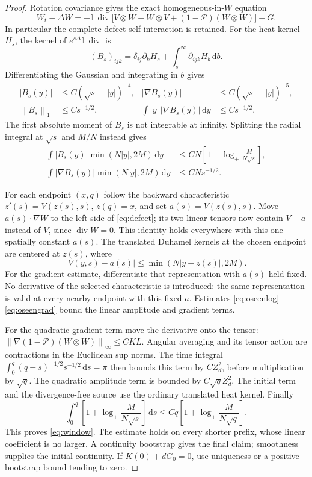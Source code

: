 \documentclass[11pt]{article}
\theoremstyle{remark}
\newcommand{\PP}{\mathcal P}
\newcommand{\dd}{\,\mathrm d}
\newcommand{\norm}[1]{\left\lVert#1\right\rVert}
\newcommand{\diver}{\operatorname{div}}
\begin{document}
\begin{proof}
Rotation covariance gives the exact homogeneous-in-$W$ equation
\begin{equation}\label{eq:defect}
 W_t-\Delta W=-\mathbb L\diver\big[V\otimes W+W\otimes V
                          +(1-\PP)(W\otimes W)\big]+G.
\end{equation}
In particular the complete defect self-interaction is retained.
For the heat kernel $H_s$, the kernel of $e^{s\Delta}\mathbb L\diver$ is
\[
 (B_s)_{ijk}=\delta_{ij}\partial_k H_s
                         +\int_s^\infty\partial_{ijk}H_b\dd b.
\]
Differentiating the Gaussian and integrating in $b$ gives
\begin{align*}
 |B_s(y)|&\leq C(\sqrt s+|y|)^{-4},&
 |\nabla B_s(y)|&\leq C(\sqrt s+|y|)^{-5},\\
 \norm{B_s}_1&\leq C s^{-1/2},&
 \int |y|\,|\nabla B_s(y)|\dd y&\leq C s^{-1/2}.
\end{align*}
The first absolute moment of $B_s$ is not integrable at infinity.
Splitting the radial integral at $\sqrt s$ and $M/N$ instead gives
\begin{align}
 \int |B_s(y)|\min(N|y|,2M)\dd y
 &\leq CN\left[1+\log_+\frac{M}{N\sqrt s}\right],\label{eq:oseenlog}\\
 \int |\nabla B_s(y)|\min(N|y|,2M)\dd y
 &\leq CNs^{-1/2}.\label{eq:oseengrad}
\end{align}

For each endpoint $(x,q)$ follow the backward characteristic
$z'(s)=V(z(s),s)$, $z(q)=x$, and set $a(s)=V(z(s),s)$.
Move $a(s)\cdot\nabla W$ to the left side of \eqref{eq:defect};
its two linear tensors now contain $V-a$ instead of $V$, since
$\diver W=0$. This identity holds everywhere with this one
spatially constant $a(s)$. The translated Duhamel kernels at the
chosen endpoint are centered at $z(s)$, where
\[
 |V(y,s)-a(s)|\leq\min(N|y-z(s)|,2M).
\]
For the gradient estimate, differentiate that representation with
$a(s)$ held fixed. No derivative of the selected characteristic is
introduced: the same representation is valid at every nearby endpoint
with this fixed $a$. Estimates \eqref{eq:oseenlog}--\eqref{eq:oseengrad}
bound the linear amplitude and gradient terms.

For the quadratic gradient term move the derivative onto the tensor:
$\norm{\nabla(1-\PP)(W\otimes W)}_\infty\leq CKL$.
Angular averaging and its tensor action are contractions in the
Euclidean sup norms. The time integral
$\int_0^q(q-s)^{-1/2}s^{-1/2}\dd s=\pi$ then bounds this term
by $CZ_d^2$, before multiplication by $\sqrt q$.
The quadratic amplitude term is bounded by $C\sqrt q Z_d^2$.
The initial term and the divergence-free source use the ordinary
translated heat kernel. Finally
\[
 \int_0^q\left[1+\log_+\frac{M}{N\sqrt s}\right]\dd s
 \leq Cq\left[1+\log_+\frac{M}{N\sqrt q}\right].
\]
This proves \eqref{eq:window}. The estimate holds on every shorter
prefix, whose linear coefficient is no larger. A continuity bootstrap
gives the final claim; smoothness supplies the initial continuity.
If $K(0)+dG_0=0$, use uniqueness or a positive bootstrap bound tending
to zero.
\end{proof}
\end{document}
